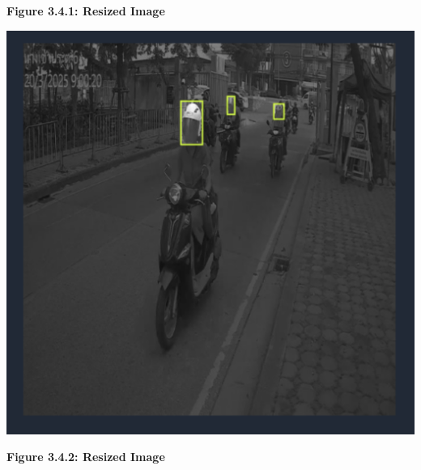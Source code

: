 \begin{center}
\begin{minipage}{0.45\textwidth}
		\textbf{Figure 3.4.1: Resized Image }
	\end{minipage}
	\hfill
	\begin{minipage}{0.45\textwidth}
		\centering
		\includegraphics[width=\linewidth]{ano2.png}
		\vspace{0.5em}
		
		\textbf{Figure 3.4.2: Resized Image }
	\end{minipage}
\end{center}


